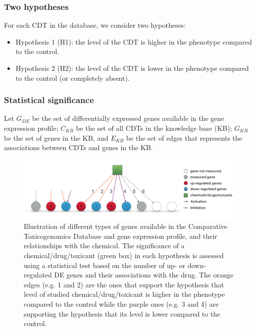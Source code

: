 \subsubsection{Two hypotheses}

For each CDT in the database, we consider two hypotheses:

\begin{itemize}
\item Hypothesis 1 (H1): the level of the CDT is higher in the phenotype compared to the control.%
\item Hypothesis 2 (H2): the level of the CDT  is lower  in the phenotype compared to the control (or completely absent).%
\end{itemize}

\subsubsection{Statistical significance}


Let $G_{DE}$ be the set of differentially expressed genes available in the gene expression profile; $C_{KB}$ be the set of all CDTs in the knowledge base (KB); $G_{KB}$ be the set of genes in the KB, and $E_{KB}$ be the set of edges that represents the associations between CDTs and genes in the KB. 

\begin{figure}
\centering
  \includegraphics[width=0.9\linewidth]{Figures/SecondEvidence.pdf}
  \caption{Illustration of different types of genes available in the Comparative Toxicogenomics Database and gene expression profile, and their relationships with the chemical. The significance of a chemical/drug/toxicant (green box) in each hypothesis is assessed using a statistical test based on the number of up- or down-regulated DE genes and their associations with the drug. The orange edges (e.g. 1 and 2) are the ones that support the hypothesis that level of studied chemical/drug/toxicant is higher in the phenotype compared to the control while the purple ones (e.g. 3 and 4) are supporting the hypothesis that its level is lower compared to the control.}
  \label{fig:SignificantDrug}
\end{figure}

